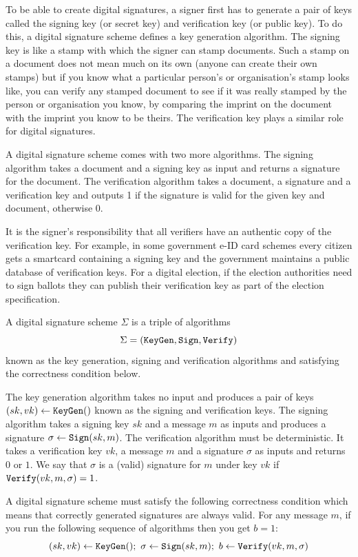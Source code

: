 \documentclass[envcountsame]{llncs}
\newcommand{\alg}[1]{\textup{\texttt{#1}}}
\begin{document}
To be able to create digital signatures, a signer first has to generate a pair
of keys called the signing key (or secret key) and verification key (or public
key). To do this, a digital signature scheme defines a key generation algorithm.
The signing key is like a stamp with which the signer can stamp documents. Such
a stamp on a document does not mean much on its own (anyone can create their own
stamps) but if you know what a particular person's or organisation's stamp looks
like, you can verify any stamped document to see if it was really stamped by the
person or organisation you know, by comparing the imprint on the document with
the imprint you know to be theirs. The verification key plays a similar role for
digital signatures.

A digital signature scheme comes with two more algorithms. The signing algorithm
takes a document and a signing key as input and returns a signature for the
document. The verification algorithm takes a document, a signature and a
verification key and outputs 1 if the signature is valid for the given key and
document, otherwise 0.

It is the signer's responsibility that all verifiers have an authentic copy of
the verification key. For example, in some government e-ID card schemes every
citizen gets a smartcard containing a signing key and the government maintains a
public database of verification keys. For a digital election, if the election
authorities need to sign ballots they can publish their verification key as part
of the election specification.

\begin{definition}
A digital signature scheme $\Sigma$ is a triple of algorithms
\[
\Sigma = \left( \alg{KeyGen}, \alg{Sign}, \alg{Verify} \right)
\]
known as the key generation, signing and verification algorithms and satisfying
the correctness condition below.

The key generation algorithm takes no input and produces a pair of keys $(sk,
vk) \gets \alg{KeyGen}()$ known as the signing and verification keys. The
signing algorithm takes a signing key $sk$ and a message $m$ as inputs and
produces a signature $\sigma \gets \alg{Sign}(sk, m)$. The verification
algorithm must be deterministic. It takes a verification key $vk$, a message $m$
and a signature $\sigma$ as inputs and returns $0$ or $1$. We say that $\sigma$
is a (valid) signature for $m$ under key $vk$ if $\alg{Verify}(vk, m, \sigma) =
1$.

A digital signature scheme must satisfy the following correctness condition
which means that correctly generated signatures are always valid. For any
message $m$, if you run the following sequence of algorithms then you get $b =
1$:
\[
(sk, vk) \gets \alg{KeyGen}();\ \sigma \gets \alg{Sign}(sk, m);\ b \gets \alg{Verify}(vk, m, \sigma)
\]
\end{definition}
\end{document}
